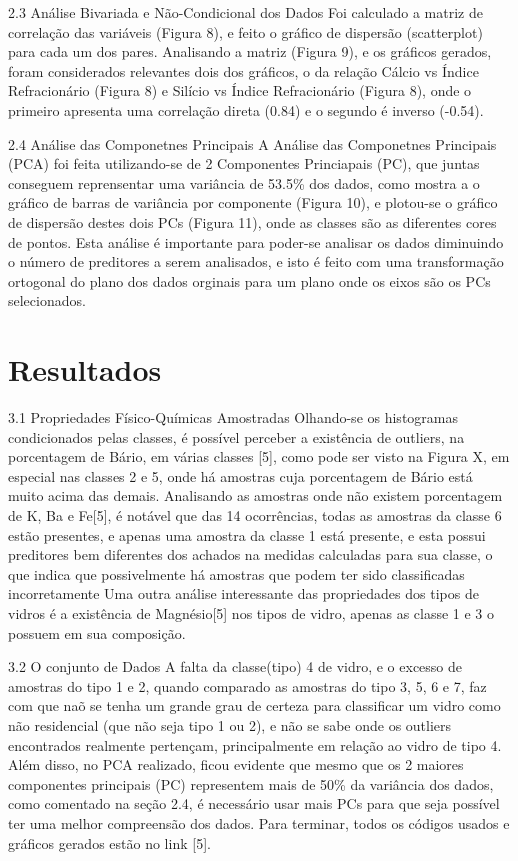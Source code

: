 \documentclass[conference]{IEEEtran}
\begin{document}
2.3 Análise Bivariada e Não-Condicional dos Dados
	Foi calculado a matriz de correlação das variáveis (Figura 8), e feito o gráfico de dispersão (scatterplot) para cada um dos pares. Analisando a matriz (Figura 9),
	e os gráficos gerados, foram considerados relevantes dois dos gráficos, o da relação Cálcio vs Índice Refracionário (Figura 8) e  Silício vs Índice Refracionário (Figura 8), onde o primeiro 
	apresenta uma correlação direta (0.84) e o segundo é inverso (-0.54).

2.4 Análise das Componetnes Principais
	A Análise das Componetnes Principais (PCA) foi feita utilizando-se de 2 Componentes Princiapais (PC), que juntas conseguem reprensentar uma variância de 53.5\% dos dados, como mostra a o gráfico
	de barras de variância por componente (Figura 10), e plotou-se o gráfico de dispersão destes dois PCs (Figura 11), onde as classes são as diferentes cores de pontos. 
	Esta análise é importante para poder-se analisar os dados diminuindo o número de preditores a serem analisados, e isto é feito com uma transformação ortogonal do plano dos dados orginais para
	um plano onde os eixos são os PCs selecionados.


\section{Resultados}
3.1 Propriedades Físico-Químicas Amostradas
	Olhando-se os histogramas condicionados pelas classes, é possível perceber a existência de outliers, na porcentagem de Bário, em várias classes [5], como pode ser visto
	na Figura X, em especial nas classes 2 e 5, onde há amostras cuja porcentagem de Bário está muito acima das demais.
	Analisando as amostras onde não existem porcentagem de K, Ba e Fe[5], é notável que das 14 ocorrências, todas as amostras da classe 6 estão presentes, e apenas uma amostra da classe 1
	está presente, e esta possui preditores bem diferentes dos achados na medidas calculadas para sua classe, o que indica que possivelmente há amostras que podem ter sido classificadas incorretamente
	Uma outra análise interessante das propriedades dos tipos de vidros é a existência de Magnésio[5] nos tipos de vidro, apenas as classe 1 e 3 o possuem em sua composição.

3.2 O conjunto de Dados
	A falta da classe(tipo) 4 de vidro, e o excesso de amostras do tipo 1 e 2, quando comparado as amostras do tipo 3, 5, 6 e 7, faz com que naõ se tenha um grande grau de certeza
	para classificar um vidro como não residencial (que não seja tipo 1 ou 2), e não se sabe onde os outliers encontrados realmente pertençam, principalmente em relação ao vidro de tipo 4.
	Além disso, no PCA realizado, ficou evidente que mesmo que os 2 maiores componentes principais (PC) representem mais de 50\% da variância dos dados, como comentado na seção 2.4, é necessário
	usar mais PCs para que seja possível ter uma melhor compreensão dos dados.
	Para terminar, todos os códigos usados e gráficos gerados estão no link [5].
\end{document}
